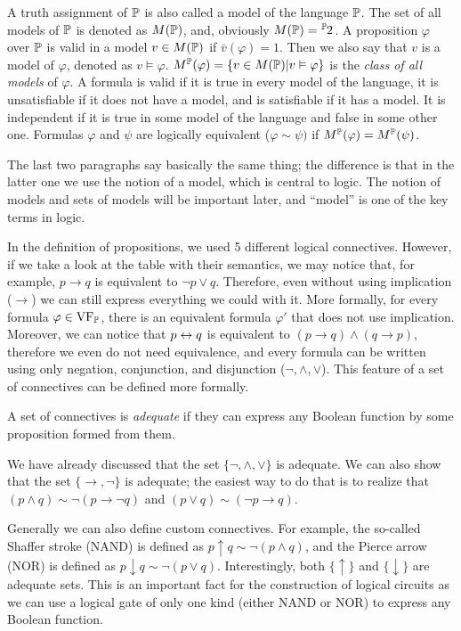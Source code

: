 A truth assignment of $\mathbb{P}$ is also called a model of the language $\mathbb{P}$. The set of all models of $\mathbb{P}$ is denoted as $M(\mathbb{P})$, and, obviously $M(\Prop) = \fset{\Prop}{2}$. A proposition $\varphi$ over $\mathbb{P}$ is valid in a model $v \in M(\mathbb{P})$ if $\bar{v}(\varphi) = 1$. Then we also say that $v$ is a model of $\varphi$, denoted as $v \vDash \varphi$. $M^\mathbb{P}(\varphi) = \{v \in M(\mathbb{P}) | v \vDash \varphi\}$ is the \emph{class of all models} of $\varphi$. A formula is valid if it is true in every model of the language, it is unsatisfiable if it does not have a model, and is satisfiable if it has a model. It is independent if it is true in some model of the language and false in some other one. Formulas $\varphi$ and $\psi$ are logically equivalent ($\varphi \sim \psi)$ if $M^\mathbb{P}(\varphi) = M^\mathbb{P}(\psi)$.

The last two paragraphs say basically the same thing; the difference is that in the latter one we use the notion of a model, which is central to logic. The notion of models and sets of models will be important later, and ``model'' is one of the key terms in logic.

In the definition of propositions, we used 5 different logical connectives. However, if we take a look at the table with their semantics, we may notice that, for example, $p \to q$ is equivalent to $\neg p \lor q$. Therefore, even without using implication ($\to$) we can still express everything we could with it. More formally, for every formula $\varphi \in \operatorname{VF}_\mathbb{P}$, there is an equivalent formula $\varphi'$ that does not use implication. Moreover, we can notice that $p \leftrightarrow q$ is equivalent to $(p \to q) \land (q \to p)$, therefore we even do not need equivalence, and every formula can be written using only negation, conjunction, and disjunction ($\neg, \land, \lor$). This feature of a set of connectives can be defined more formally.

\begin{definition}
A set of connectives is \emph{adequate} if they can express any Boolean function by some proposition formed from them.
\end{definition}

We have already discussed that the set $\{\neg, \land, \lor\}$ is adequate. We can also show that the set $\{\to, \neg\}$ is adequate; the easiest way to do that is to realize that $(p \land q) \sim \neg (p \to \neg q)$ and $(p \lor q) \sim (\neg p \to q)$. 

Generally we can also define custom connectives. For example, the so-called Shaffer stroke (NAND) is defined as $p \uparrow q \sim \neg (p \land q)$, and the Pierce arrow (NOR) is defined as $p \downarrow q \sim \neg (p \lor q)$. Interestingly, both $\{\uparrow\}$ and $\{\downarrow\}$ are adequate sets. This is an important fact for the construction of logical circuits as we can use a logical gate of only one kind (either NAND or NOR) to express any Boolean function.

